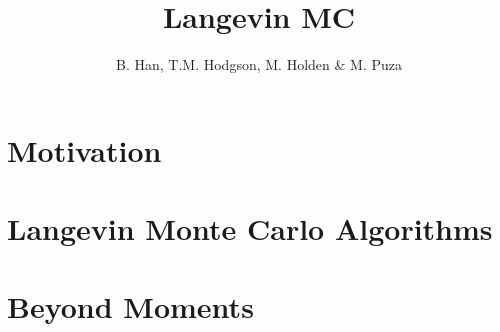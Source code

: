 \documentclass[a4paper]{article}
\title{Langevin MC}
\author{B. Han, T.M. Hodgson, M. Holden \& M. Puza}
\theoremstyle{definition}
\begin{document}
	\maketitle 
	\section{Motivation}
	
	\section{Langevin Monte Carlo Algorithms}
		
	
	\section{Beyond Moments}
	

	
	
		
\end{document}
